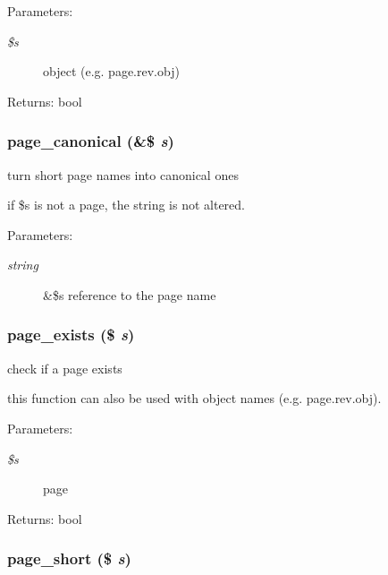 \begin{Desc}
\item[Parameters:]
\begin{description}
\item[{\em \$s}]object (e.g. page.rev.obj) \end{description}
\end{Desc}
\begin{Desc}
\item[Returns:]bool \end{Desc}
\hypertarget{common_8inc_8php_31ed04b0c90ac3077e71743c307d45f8}{
\subsubsection[{page\_\-canonical}]{\setlength{\rightskip}{0pt plus 5cm}page\_\-canonical (\&\$ {\em s})}}
\label{common_8inc_8php_31ed04b0c90ac3077e71743c307d45f8}


turn short page names into canonical ones

if \$s is not a page, the string is not altered. \begin{Desc}
\item[Parameters:]
\begin{description}
\item[{\em string}]\&\$s reference to the page name \end{description}
\end{Desc}
\hypertarget{common_8inc_8php_a71868111dd5b8af98df9cc9c968e523}{
\subsubsection[{page\_\-exists}]{\setlength{\rightskip}{0pt plus 5cm}page\_\-exists (\$ {\em s})}}
\label{common_8inc_8php_a71868111dd5b8af98df9cc9c968e523}


check if a page exists

this function can also be used with object names (e.g. page.rev.obj). \begin{Desc}
\item[Parameters:]
\begin{description}
\item[{\em \$s}]page \end{description}
\end{Desc}
\begin{Desc}
\item[Returns:]bool \end{Desc}
\hypertarget{common_8inc_8php_da968adfb989aa09adaf29867208f1ab}{
\subsubsection[{page\_\-short}]{\setlength{\rightskip}{0pt plus 5cm}page\_\-short (\$ {\em s})}}
\label{common_8inc_8php_da968adfb989aa09adaf29867208f1ab}


